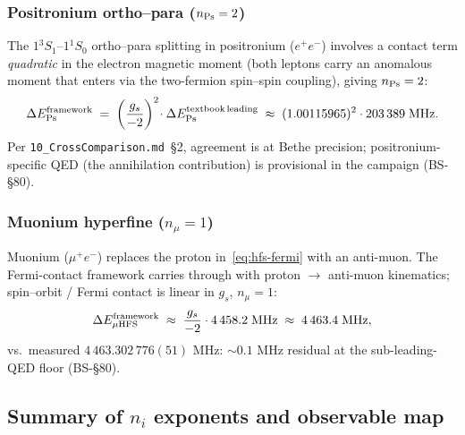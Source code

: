 \subsubsection{Positronium ortho--para ($n_{\rm Ps} = 2$)}

The $1{}^3S_1$--$1{}^1S_0$ ortho--para splitting in positronium ($e^+ e^-$)
involves a contact term \emph{quadratic} in the electron magnetic moment
(both leptons carry an anomalous moment that enters via the
two-fermion spin--spin coupling), giving $n_{\rm Ps} = 2$:
\begin{equation}
\Delta E_{\rm Ps}^{\rm framework}
\;=\; \left(\frac{g_s}{-2}\right)^{2}\!\cdot\Delta E_{\rm Ps}^{\rm textbook\,leading}
\;\approx\; (1.00115965)^2 \cdot 203\,389\;\text{MHz}.
\end{equation}
Per \texttt{10\_CrossComparison.md}~\S2, agreement is at Bethe precision;
positronium-specific QED (the annihilation contribution) is provisional in
the campaign (BS-\S80).

\subsubsection{Muonium hyperfine ($n_\mu = 1$)}

Muonium ($\mu^+ e^-$) replaces the proton in~\eqref{eq:hfs-fermi} with an
anti-muon. The Fermi-contact framework carries through with proton
$\to$ anti-muon kinematics; spin--orbit / Fermi contact is linear in
$g_s$, $n_\mu = 1$:
\begin{equation}
\Delta E_{\mu\rm{HFS}}^{\rm framework}
\;\approx\; \frac{g_s}{-2}\cdot 4\,458.2\;\text{MHz}
\;\approx\; 4\,463.4\;\text{MHz},
\end{equation}
vs.~measured $4\,463.302\,776(51)$ MHz: $\sim 0.1$ MHz residual at the
sub-leading-QED floor (BS-\S80).

\subsection{Summary of $n_i$ exponents and observable map}

